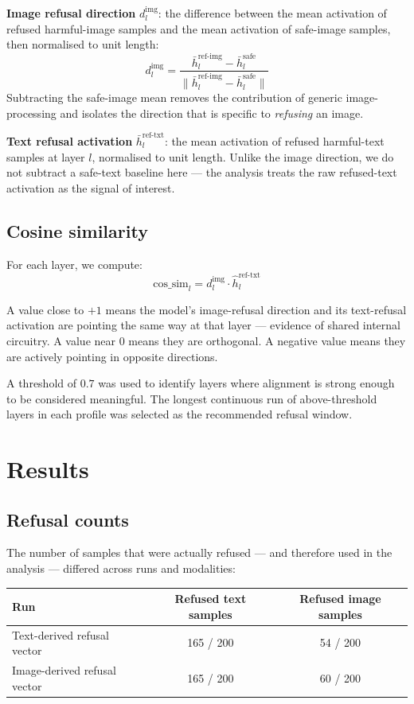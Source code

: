 \documentclass[11pt]{article}
\begin{document}
\textbf{Image refusal direction} $d^{\text{img}}_l$: the difference between the mean activation of refused harmful-image samples and the mean activation of safe-image samples, then normalised to unit length:
\[
d^{\text{img}}_l = \frac{\bar{h}^{\text{ref-img}}_l - \bar{h}^{\text{safe}}_l}{\|\bar{h}^{\text{ref-img}}_l - \bar{h}^{\text{safe}}_l\|}
\]
Subtracting the safe-image mean removes the contribution of generic image-processing and isolates the direction that is specific to \textit{refusing} an image.

\textbf{Text refusal activation} $\bar{h}^{\text{ref-txt}}_l$: the mean activation of refused harmful-text samples at layer $l$, normalised to unit length. Unlike the image direction, we do not subtract a safe-text baseline here — the analysis treats the raw refused-text activation as the signal of interest.

\subsection*{Cosine similarity}

For each layer, we compute:
\[
\text{cos\_sim}_l = d^{\text{img}}_l \cdot \hat{h}^{\text{ref-txt}}_l
\]

A value close to $+1$ means the model's image-refusal direction and its text-refusal activation are pointing the same way at that layer — evidence of shared internal circuitry. A value near $0$ means they are orthogonal. A negative value means they are actively pointing in opposite directions.

A threshold of $0.7$ was used to identify layers where alignment is strong enough to be considered meaningful. The longest continuous run of above-threshold layers in each profile was selected as the recommended refusal window.

\section*{Results}

\subsection*{Refusal counts}

The number of samples that were actually refused — and therefore used in the analysis — differed across runs and modalities:

\begin{center}
\begin{tabular}{lcc}
\toprule
Run & Refused text samples & Refused image samples \\
\midrule
Text-derived refusal vector & 165 / 200 & 54 / 200 \\
Image-derived refusal vector & 165 / 200 & 60 / 200 \\
\bottomrule
\end{tabular}
\end{center}
\end{document}
